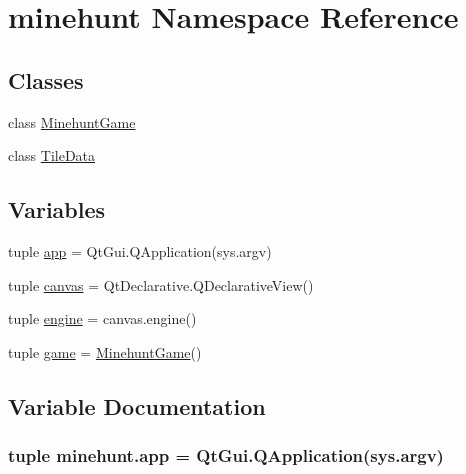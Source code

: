 \hypertarget{namespaceminehunt}{}\section{minehunt Namespace Reference}
\label{namespaceminehunt}
\subsection*{Classes}
\begin{DoxyCompactItemize}
\item 
class \hyperlink{classminehunt_1_1MinehuntGame}{Minehunt\+Game}
\item 
class \hyperlink{classminehunt_1_1TileData}{Tile\+Data}
\end{DoxyCompactItemize}
\subsection*{Variables}
\begin{DoxyCompactItemize}
\item 
tuple \hyperlink{namespaceminehunt_aabe2045c72e511d5e49a1023406c62bb}{app} = Qt\+Gui.\+Q\+Application(sys.\+argv)
\item 
tuple \hyperlink{namespaceminehunt_a95bf34e01941ada4b7ba4d7d2f2e4348}{canvas} = Qt\+Declarative.\+Q\+Declarative\+View()
\item 
tuple \hyperlink{namespaceminehunt_a3b60fdaf59a43222aae1dfe8c6b1ede1}{engine} = canvas.\+engine()
\item 
tuple \hyperlink{namespaceminehunt_ac090c8abc859f2cb2a63e47058fd6c78}{game} = \hyperlink{classminehunt_1_1MinehuntGame}{Minehunt\+Game}()
\end{DoxyCompactItemize}


\subsection{Variable Documentation}
\hypertarget{namespaceminehunt_aabe2045c72e511d5e49a1023406c62bb}{}
\subsubsection[{app}]{\setlength{\rightskip}{0pt plus 5cm}tuple minehunt.\+app = Qt\+Gui.\+Q\+Application(sys.\+argv)}\label{namespaceminehunt_aabe2045c72e511d5e49a1023406c62bb}
\hypertarget{namespaceminehunt_a95bf34e01941ada4b7ba4d7d2f2e4348}{}
